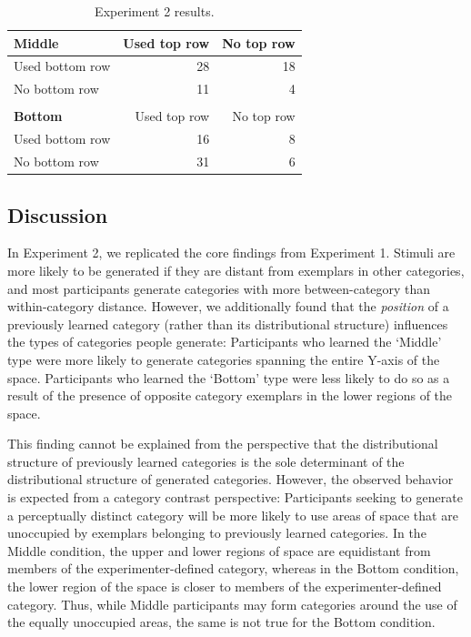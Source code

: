 \documentclass[12pt]{article}
\begin{document}
\begin{flushleft}
\begin{table}
\begin{center}
\caption{Experiment 2 results.}
\label{table:e2-subset-table} \vskip 0.12in
\begin{tabular}{ l r r} \textbf{Middle} & Used top row & No top row \\ \hline
Used bottom row & 28 & 18 \\ No bottom row & 11 & 4 \\ \\ \textbf{Bottom} & Used
top row & No top row \\ \hline Used bottom row & 16 & 8 \\ No bottom row & 31 &
6 \\
\end{tabular}
\end{center}
\end{table}

\subsection{Discussion}

In Experiment 2, we replicated the core findings from Experiment 1. Stimuli are
more likely to be generated if they are distant from exemplars in other
categories, and most participants generate categories with more between-category
than within-category distance. However, we additionally found that the {\em
position} of a previously learned category (rather than its distributional
structure) influences the types of categories people generate: Participants who
learned the `Middle' type were more likely to generate categories spanning the
entire Y-axis of the space. Participants who learned the `Bottom' type were less
likely to do so as a result of the presence of opposite category exemplars in
the lower regions of the space.

This finding cannot be explained from the perspective that the distributional
structure of previously learned categories is the sole determinant of the
distributional structure of generated categories. However, the observed behavior
is expected from a category contrast perspective: Participants seeking to
generate a perceptually distinct category will be more likely to use areas of
space that are unoccupied by exemplars belonging to previously learned
categories. In the Middle condition, the upper and lower regions of space are
equidistant from members of the experimenter-defined category, whereas in the
Bottom condition, the lower region of the space is closer to members of the
experimenter-defined category. Thus, while Middle participants may form
categories around the use of the equally unoccupied areas, the same is not true
for the Bottom condition.


\end{flushleft}
\end{document}
